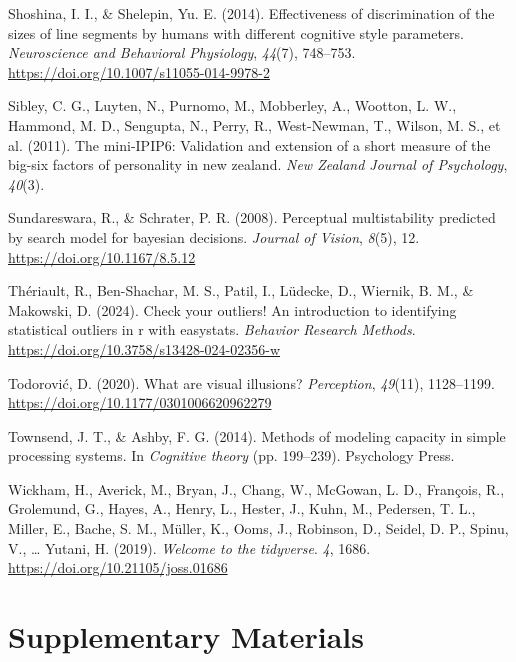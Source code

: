 \documentclass[
  man,
  floatsintext,
  longtable,
  nolmodern,
  notxfonts,
  notimes,
  colorlinks=true,linkcolor=blue,citecolor=blue,urlcolor=blue]{apa7}
\newlength{\cslhangindent}
\newenvironment{CSLReferences}[2] %
 {\begin{list}{}{%
  \setlength{\itemindent}{0pt}
  \setlength{\leftmargin}{0pt}
  \setlength{\parsep}{0pt}
  \ifodd #1
   \setlength{\leftmargin}{\cslhangindent}
   \setlength{\itemindent}{-1\cslhangindent}
  \fi
  \setlength{\itemsep}{#2\baselineskip}}}
 {\end{list}}
\begin{document}
\begin{CSLReferences}{1}{0}
Shoshina, I. I., \& Shelepin, Yu. E. (2014). Effectiveness of
discrimination of the sizes of line segments by humans with different
cognitive style parameters. \emph{Neuroscience and Behavioral
Physiology}, \emph{44}(7), 748--753.
\url{https://doi.org/10.1007/s11055-014-9978-2}

{Sibley, C. G., Luyten, N., Purnomo, M., Mobberley, A., Wootton, L. W.,
Hammond, M. D., Sengupta, N., Perry, R., West-Newman, T., Wilson, M. S.,
et al.} (2011). The mini-IPIP6: Validation and extension of a short
measure of the big-six factors of personality in new zealand. \emph{New
Zealand Journal of Psychology}, \emph{40}(3).

Sundareswara, R., \& Schrater, P. R. (2008). Perceptual multistability
predicted by search model for bayesian decisions. \emph{Journal of
Vision}, \emph{8}(5), 12. \url{https://doi.org/10.1167/8.5.12}

Thériault, R., Ben-Shachar, M. S., Patil, I., Lüdecke, D., Wiernik, B.
M., \& Makowski, D. (2024). Check your outliers﻿! An introduction to
identifying statistical outliers in r with easystats. \emph{Behavior
Research Methods}. \url{https://doi.org/10.3758/s13428-024-02356-w}

Todorović, D. (2020). What are visual illusions? \emph{Perception},
\emph{49}(11), 1128--1199.
\url{https://doi.org/10.1177/0301006620962279}

Townsend, J. T., \& Ashby, F. G. (2014). Methods of modeling capacity in
simple processing systems. In \emph{Cognitive theory} (pp. 199--239).
Psychology Press.

Wickham, H., Averick, M., Bryan, J., Chang, W., McGowan, L. D.,
François, R., Grolemund, G., Hayes, A., Henry, L., Hester, J., Kuhn, M.,
Pedersen, T. L., Miller, E., Bache, S. M., Müller, K., Ooms, J.,
Robinson, D., Seidel, D. P., Spinu, V., \ldots{} Yutani, H. (2019).
\emph{Welcome to the {\textbraceleft}tidyverse{\textbraceright}}.
\emph{4}, 1686. \url{https://doi.org/10.21105/joss.01686}

\end{CSLReferences}

\pagebreak

\appendix

\section{Supplementary Materials}\label{apx-supplementary-materials}
\end{document}

